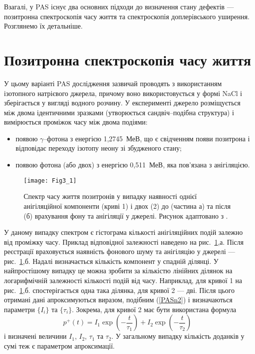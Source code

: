 Взагалі, у PAS існує два основних підходи до визначення стану дефектів ---позитронна спектроскопія часу життя
та спектроскопія доплерівського уширення.
Розглянемо їх детальніше.

\section{Позитронна спектроскопія часу життя}\label{secPAS_PSLT}
У цьому варіанті PAS дослідження зазвичай проводять з використанням ізотопного натрієвого джерела,
причому воно використовується у формі NaCl і зберігається у вигляді водного розчину.
У експерименті джерело розміщується між двома ідентичними зразками
(утворюється сандвіч--подібна структура) і
вимірюється проміжок часу між двома подіями:
\begin{itemize}[leftmargin=0em,itemindent=1.5em]
\item появою $\gamma$--фотона з енергією 1,2745~МеВ, що є свідченням появи позитрона і відповідає переходу ізотопу неону зі збудженого стану;
\item появою фотона (або двох) з енергією 0,511~МеВ, яка пов'язана з анігіляцією.
\end{itemize}

\begin{figure}[b]
\center
\vspace{-2mm}
\texttt{[image: Fig3\_1]}
\vspace{-3mm}
\caption{Спектр часу життя позитронів у випадку наявності однієї анігіляційної компоненти
(криві 1) і двох (2) до (частина а) та після (б) врахування фону та
анігіляції у джерелі.
Рисунок адаптовано з \cite{PAS}.}
\vspace{-3mm}
\label{F31}
\end{figure}

У даному випадку спектром є гістограма кількості анігіляційних подій залежно від проміжку часу.
Приклад відповідної залежності наведено на рис.~\ref{F31},а.
Після реєстрації враховується наявність фонового шуму та анігіляцію у джерелі --- рис.~\ref{F31},б.
Надалі визначається кількість компонент у спадній ділянці.
У найпростішому випадку це можна зробити за кількістю лінійних ділянок на логарифмічній залежності
кількості подій від часу.
Наприклад, для кривої 1 на рис.~\ref{F31},б. спостерігається одна така ділянка,
для кривої 2 --- дві.
Після цього отримані дані апроксимуються виразом, подібним (\ref{PASn2}) і визначаються параметри $\{I_i\}$ та $\{\tau_i\}$.
Зокрема, для кривої 2 має бути використана формула
\begin{equation*}
p^+(t)=I_1\exp\left(-\frac{t}{\tau_1}\right)+I_2\exp\left(-\frac{t}{\tau_2}\right)\,
\end{equation*}
і визначені величини $I_1$, $I_2$, $\tau_1$ та $\tau_2$.
У загальному випадку кількість доданків у сумі теж є параметром апроксимації.

